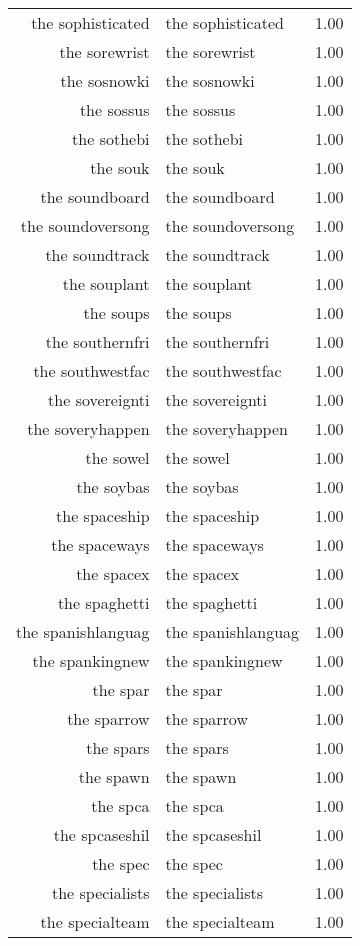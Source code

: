\begin{table}[ht]
\begin{tabular}{rlr}
  the sophisticated & the sophisticated & 1.00 \\ 
  the sorewrist & the sorewrist & 1.00 \\ 
  the sosnowki & the sosnowki & 1.00 \\ 
  the sossus & the sossus & 1.00 \\ 
  the sothebi & the sothebi & 1.00 \\ 
  the souk & the souk & 1.00 \\ 
  the soundboard & the soundboard & 1.00 \\ 
  the soundoversong & the soundoversong & 1.00 \\ 
  the soundtrack & the soundtrack & 1.00 \\ 
  the souplant & the souplant & 1.00 \\ 
  the soups & the soups & 1.00 \\ 
  the southernfri & the southernfri & 1.00 \\ 
  the southwestfac & the southwestfac & 1.00 \\ 
  the sovereignti & the sovereignti & 1.00 \\ 
  the soveryhappen & the soveryhappen & 1.00 \\ 
  the sowel & the sowel & 1.00 \\ 
  the soybas & the soybas & 1.00 \\ 
  the spaceship & the spaceship & 1.00 \\ 
  the spaceways & the spaceways & 1.00 \\ 
  the spacex & the spacex & 1.00 \\ 
  the spaghetti & the spaghetti & 1.00 \\ 
  the spanishlanguag & the spanishlanguag & 1.00 \\ 
  the spankingnew & the spankingnew & 1.00 \\ 
  the spar & the spar & 1.00 \\ 
  the sparrow & the sparrow & 1.00 \\ 
  the spars & the spars & 1.00 \\ 
  the spawn & the spawn & 1.00 \\ 
  the spca & the spca & 1.00 \\ 
  the spcaseshil & the spcaseshil & 1.00 \\ 
  the spec & the spec & 1.00 \\ 
  the specialists & the specialists & 1.00 \\ 
  the specialteam & the specialteam & 1.00 \\ 

\end{tabular}
\end{table}

